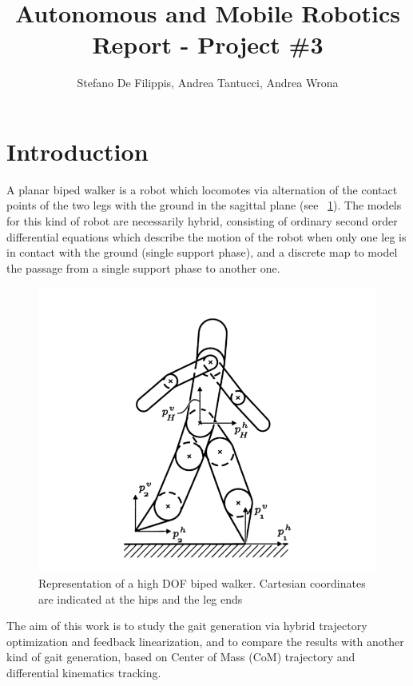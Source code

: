 \documentclass[11pt]{article}
\begin{document}
\title{Autonomous and Mobile Robotics Report - Project \#3\\}
\author{Stefano De Filippis, Andrea Tantucci, Andrea Wrona}

\maketitle

\thispagestyle{empty}

\section*{Introduction}

A planar biped walker is a robot which locomotes via alternation of the contact points of the two legs with the ground in the sagittal plane (see \figurename\, \ref{fig: planar biped walker}). The models for this kind of robot are necessarily hybrid, consisting of ordinary second order differential equations which describe the motion of the robot when only one leg is in contact with the ground (single support phase), and a discrete map to model the passage from a single support phase to another one.

\begin{figure}[H]
\centering
\includegraphics[width=.6\textwidth]{Images/Planar_biped_walker.png}
\caption{Representation of a high DOF biped walker. Cartesian coordinates are indicated at the hips and the leg ends}
\label{fig: planar biped walker}
\end{figure}

The aim of this work is to study the gait generation via hybrid trajectory optimization and feedback linearization, and to compare the results with another kind of gait generation, based on Center of Mass (CoM) trajectory and differential kinematics tracking. 
\end{document}
